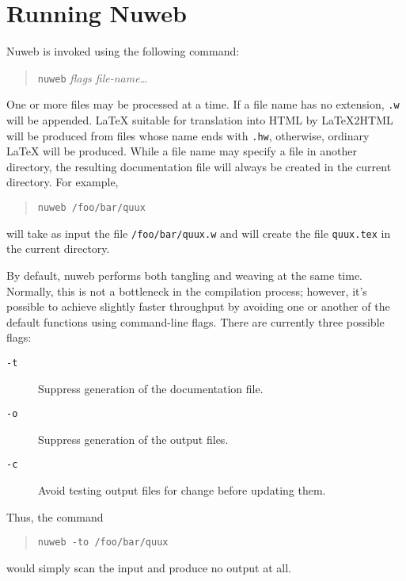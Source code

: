 \documentclass[a4paper]{report}
\begin{document}
\section{Running Nuweb}

Nuweb is invoked using the following command:
\begin{quote}
{\tt nuweb} {\em flags file-name}\ldots
\end{quote}
One or more files may be processed at a time. If a file name has no
extension, \verb|.w| will be appended.  {\LaTeX} suitable for
translation into HTML by {\LaTeX}2HTML will be produced from
files whose name ends with \verb|.hw|, otherwise, ordinary {\LaTeX} will be
produced.  While a file name may specify a file in another directory,
the resulting documentation file will always be created in the current
directory. For example,
\begin{quote}
{\tt nuweb /foo/bar/quux}
\end{quote}
will take as input the file \verb|/foo/bar/quux.w| and will create the
file \verb|quux.tex| in the current directory.

By default, nuweb performs both tangling and weaving at the same time.
Normally, this is not a bottleneck in the compilation process;
however, it's possible to achieve slightly faster throughput by
avoiding one or another of the default functions using command-line
flags. There are currently three possible flags:
\begin{description}
\item[\tt -t] Suppress generation of the documentation file.
\item[\tt -o] Suppress generation of the output files.
\item[\tt -c] Avoid testing output files for change before updating them.
\end{description}
Thus, the command
\begin{quote}
\verb|nuweb -to /foo/bar/quux|
\end{quote}
would simply scan the input and produce no output at all.
\end{document}

